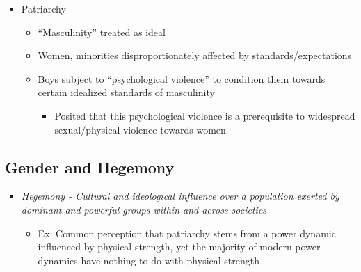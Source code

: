 \documentclass[a4paper]{article}
\begin{document}
\begin{itemize}
\begin{itemize}
    \item Patriarchy \begin{itemize}
      \item ``Masculinity'' treated as ideal
      \item Women, minorities disproportionately affected by standards/expectations
      \item Boys subject to ``psychological violence'' to condition them towards certain idealized
      standards of masculinity \begin{itemize}
        \item Posited that this psychological violence is a prerequisite to widespread sexual/physical violence towards women
      \end{itemize}
    \end{itemize}
  \end{itemize}
\end{itemize}

\subsection{Gender and Hegemony}
\begin{itemize}
  \item \it{Hegemony} - Cultural and ideological influence over a population exerted by dominant and powerful groups within and across societies \begin{itemize}
    \item Ex: Common perception that patriarchy stems from a power dynamic influenced by physical
    strength, yet the majority of modern power dynamics have nothing to do with physical strength
  \end{itemize}
\end{itemize}
\end{document}
